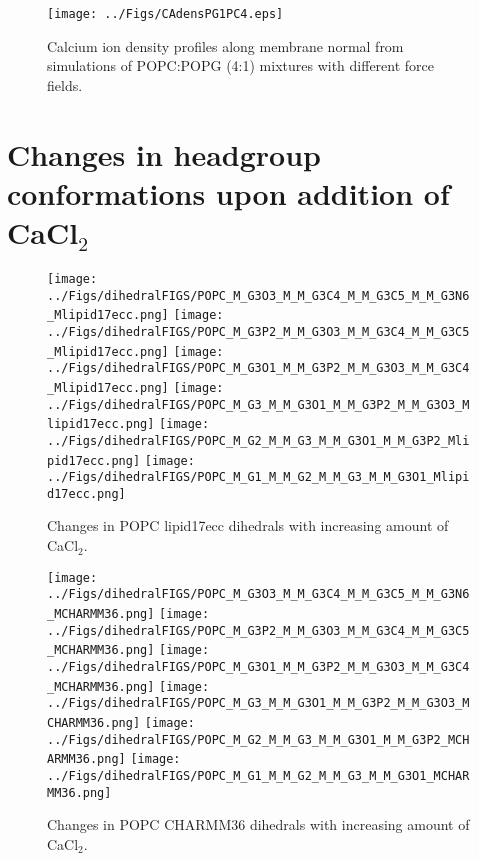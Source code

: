 \documentclass[journal=jpcbfk]{achemso}
\begin{document}
\begin{figure}[]
  \centering
  \texttt{[image: ../Figs/CAdensPG1PC4.eps]}
  \caption{\label{CAdensPG1PC4}
    Calcium ion density profiles along membrane normal from simulations of POPC:POPG (4:1) mixtures with different force fields.
  }
\end{figure}

\clearpage
\section{Changes in headgroup conformations upon addition of CaCl$_2$}


\begin{figure}[]
  \centering
  \texttt{[image: ../Figs/dihedralFIGS/POPC\_M\_G3O3\_M\_M\_G3C4\_M\_M\_G3C5\_M\_M\_G3N6\_Mlipid17ecc.png]}
  \texttt{[image: ../Figs/dihedralFIGS/POPC\_M\_G3P2\_M\_M\_G3O3\_M\_M\_G3C4\_M\_M\_G3C5\_Mlipid17ecc.png]}
  \texttt{[image: ../Figs/dihedralFIGS/POPC\_M\_G3O1\_M\_M\_G3P2\_M\_M\_G3O3\_M\_M\_G3C4\_Mlipid17ecc.png]}
  \texttt{[image: ../Figs/dihedralFIGS/POPC\_M\_G3\_M\_M\_G3O1\_M\_M\_G3P2\_M\_M\_G3O3\_Mlipid17ecc.png]}
  \texttt{[image: ../Figs/dihedralFIGS/POPC\_M\_G2\_M\_M\_G3\_M\_M\_G3O1\_M\_M\_G3P2\_Mlipid17ecc.png]}
  \texttt{[image: ../Figs/dihedralFIGS/POPC\_M\_G1\_M\_M\_G2\_M\_M\_G3\_M\_M\_G3O1\_Mlipid17ecc.png]}  
  \caption{\label{DIHSwithCAlipid17eccPOPC}
    Changes in POPC lipid17ecc dihedrals with increasing amount of CaCl$_2$.
  }
\end{figure}

\begin{figure}[]
  \centering
  \texttt{[image: ../Figs/dihedralFIGS/POPC\_M\_G3O3\_M\_M\_G3C4\_M\_M\_G3C5\_M\_M\_G3N6\_MCHARMM36.png]}
  \texttt{[image: ../Figs/dihedralFIGS/POPC\_M\_G3P2\_M\_M\_G3O3\_M\_M\_G3C4\_M\_M\_G3C5\_MCHARMM36.png]}
  \texttt{[image: ../Figs/dihedralFIGS/POPC\_M\_G3O1\_M\_M\_G3P2\_M\_M\_G3O3\_M\_M\_G3C4\_MCHARMM36.png]}
  \texttt{[image: ../Figs/dihedralFIGS/POPC\_M\_G3\_M\_M\_G3O1\_M\_M\_G3P2\_M\_M\_G3O3\_MCHARMM36.png]}
  \texttt{[image: ../Figs/dihedralFIGS/POPC\_M\_G2\_M\_M\_G3\_M\_M\_G3O1\_M\_M\_G3P2\_MCHARMM36.png]}
  \texttt{[image: ../Figs/dihedralFIGS/POPC\_M\_G1\_M\_M\_G2\_M\_M\_G3\_M\_M\_G3O1\_MCHARMM36.png]}  
  \caption{\label{DIHSwithCAcharmm36POPC}
    Changes in POPC CHARMM36 dihedrals with increasing amount of CaCl$_2$.
  }
\end{figure}
\end{document}
